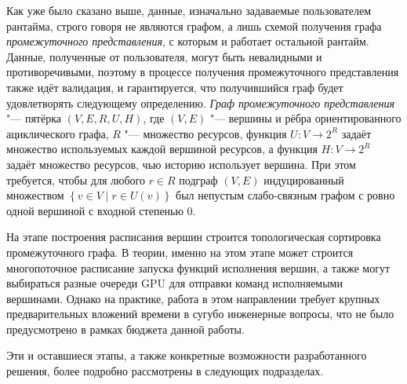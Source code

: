 Как уже было сказано выше, данные, изначально задаваемые пользователем рантайма, строго говоря не являются графом, а лишь схемой получения графа \textit{промежуточного представления}, с которым и работает остальной рантайм.
Данные, полученные от пользователя, могут быть невалидными и противоречивыми, поэтому в процессе получения промежуточного представления также идёт валидация, и гарантируется, что получившийся граф будет удовлетворять следующему определению.
\textit{Граф промежуточного представления} "--- пятёрка $(V, E, R, U, H)$, где $(V, E)$ "--- вершины и рёбра ориентированного ациклического графа, $R$ "--- множество ресурсов, функция $U : V \to 2^R$ задаёт множество используемых каждой вершиной ресурсов, а функция $H : V \to 2^R$ задаёт множество ресурсов, чью историю использует вершина.
При этом требуется, чтобы для любого $r\in R$ подграф $(V, E)$ индуцированный множеством $\left\{v \in V \middle| r \in U(v)\right\}$ был непустым слабо-связным графом с ровно одной вершиной с входной степенью $0$.

На этапе построения расписания вершин строится топологическая сортировка промежуточного графа.
В теории, именно на этом этапе может строится многопоточное расписание запуска функций исполнения вершин, а также могут выбираться разные очереди GPU для отправки команд исполняемыми вершинами.
Однако на практике, работа в этом направлении требует крупных предварительных вложений времени в сугубо инженерные вопросы, что не было предусмотрено в рамках бюджета данной работы.

Эти и оставшиеся этапы, а также конкретные возможности разработанного решения, более подробно рассмотрены в следующих подразделах.

